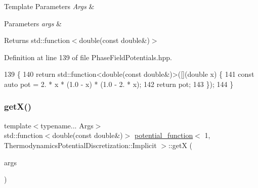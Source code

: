 \begin{DoxyTemplParams}{Template Parameters}
{\em Args} & \\
\hline
\end{DoxyTemplParams}

\begin{DoxyParams}{Parameters}
{\em args} & \\
\hline
\end{DoxyParams}
\begin{DoxyReturn}{Returns}
std\+::function$<$double(const double\&)$>$ 
\end{DoxyReturn}


Definition at line 139 of file Phase\+Field\+Potentials.\+hpp.


\begin{DoxyCode}
139                                                         \{
140     \textcolor{keywordflow}{return} std::function<double(const double&)>([](\textcolor{keywordtype}{double} x) \{
141       \textcolor{keyword}{const} \textcolor{keyword}{auto} pot = 2. * x * (1.0 - x) * (1.0 - 2. * x);
142       \textcolor{keywordflow}{return} pot;
143     \});
144   \}
\end{DoxyCode}
\mbox{\label{structpotential__function_3_011_00_01ThermodynamicsPotentialDiscretization_1_1Implicit_01_4_ac886230109344fb32f98f4e5816665c7}} 
\subsubsection{\texorpdfstring{get\+X()}{getX()}}
{\footnotesize\ttfamily template$<$typename... Args$>$ \\
std\+::function$<$double(const double\&)$>$ \hyperlink{structpotential__function}{potential\+\_\+function}$<$ 1, Thermodynamics\+Potential\+Discretization\+::\+Implicit $>$\+::getX (\begin{DoxyParamCaption}\item[{Args...}]{args }\end{DoxyParamCaption})\hspace{0.3cm}{\ttfamily [inline]}}



